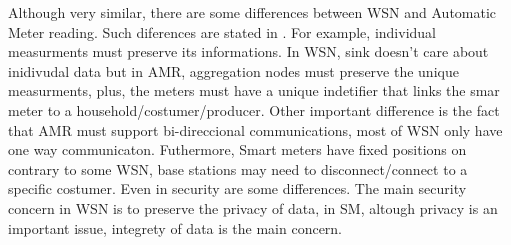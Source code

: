 Although very similar, there are some differences between WSN and Automatic Meter reading. Such diferences are stated in \cite{khalifa2011survey}. For example, individual measurments must preserve its informations. In WSN, sink doesn't care about inidivudal data but in AMR, aggregation nodes must preserve the unique measurments, plus, the meters must have a unique indetifier that links the smar meter to a household/costumer/producer. Other  important difference is the fact that AMR must support bi-direccional communications, most of WSN only have one way communicaton. Futhermore, Smart meters have fixed positions on contrary to some WSN, base stations may need to disconnect/connect to a specific costumer. Even in security are some differences. The main security concern in WSN is to preserve the privacy of data, in SM, altough privacy is an important issue, integrety of data is the main concern.

